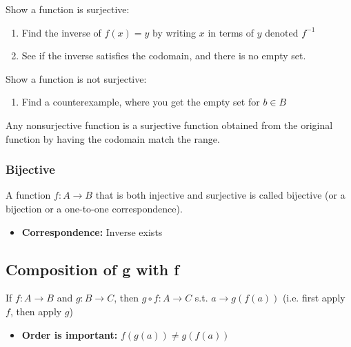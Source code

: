     \begin{process}
        Show a function is surjective:
        \begin{enumerate}
            \item Find the inverse of $f(x)=y$ by writing $x$ in terms of $y$ denoted $f^{-1}$
            \item See if the inverse satisfies the codomain, and there is no empty set.
        \end{enumerate}
        \vspace{1em}

        Show a function is not surjective:
        \begin{enumerate}
            \item Find a counterexample, where you get the empty set for $b\in B$
        \end{enumerate}
    \end{process}

    \begin{warning}
        Any nonsurjective function is a surjective function obtained from the original function by having the codomain match the range.
    \end{warning}

    \subsubsection{Bijective}
    \begin{definition}
        A function \( f: A \to B \) that is both injective and surjective is called bijective (or a bijection or a one-to-one correspondence).
        \begin{itemize}
            \item \textbf{Correspondence:} Inverse exists
        \end{itemize}
    \end{definition}

\subsection{Composition of g with f}
\begin{definition}
    If \( f: A \to B \) and \( g: B \to C \), then \( g \circ f: A \to C \) s.t. $a \rightarrow g(f(a))$ (i.e. first apply $f$, then apply $g$)
    
    \begin{itemize}
        \item \textbf{Order is important:} $ f(g(a)) \neq g(f(a)) $
    \end{itemize}
\end{definition}

